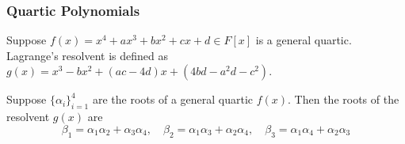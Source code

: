 \subsubsection*{Quartic Polynomials}

\begin{definition}
    Suppose \(f(x) = x^4 + ax^3 + bx^2 + cx + d \in F[x]\) is a general quartic.
    Lagrange's resolvent is defined as
    \(g(x) = x^3 - bx^2 + (ac-4d)x + (4bd-a^2d-c^2)\).
\end{definition}
\begin{proposition}
    Suppose \({\{\alpha_i\}}_{i=1}^4\) are the roots of a general quartic \(f(x)\).
    Then the roots of the resolvent \(g(x)\) are
    \begin{equation*}
        \beta_1 = \alpha_1\alpha_2 + \alpha_3\alpha_4,\quad
        \beta_2 = \alpha_1\alpha_3 + \alpha_2\alpha_4,\quad
        \beta_3 = \alpha_1\alpha_4 + \alpha_2\alpha_3
    \end{equation*}
\end{proposition}

